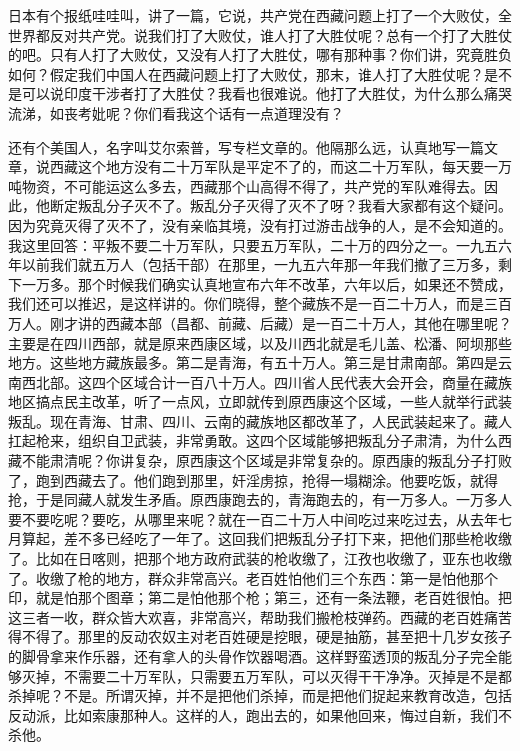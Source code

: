 日本有个报纸哇哇叫，讲了一篇，它说，共产党在西藏问题上打了一个大败仗，全世界都反对共产党。说我们打了大败仗，谁人打了大胜仗呢？总有一个打了大胜仗的吧。只有人打了大败仗，又没有人打了大胜仗，哪有那种事？你们讲，究竟胜负如何？假定我们中国人在西藏问题上打了大败仗，那末，谁人打了大胜仗呢？是不是可以说印度干涉者打了大胜仗？我看也很难说。他打了大胜仗，为什么那么痛哭流涕，如丧考妣呢？你们看我这个话有一点道理没有？

还有个美国人，名字叫艾尔索普，写专栏文章的。他隔那么远，认真地写一篇文章，说西藏这个地方没有二十万军队是平定不了的，而这二十万军队，每天要一万吨物资，不可能运这么多去，西藏那个山高得不得了，共产党的军队难得去。因此，他断定叛乱分子灭不了。叛乱分子灭得了灭不了呀？我看大家都有这个疑问。因为究竟灭得了灭不了，没有亲临其境，没有打过游击战争的人，是不会知道的。我这里回答：平叛不要二十万军队，只要五万军队，二十万的四分之一。一九五六年以前我们就五万人（包括干部）在那里，一九五六年那一年我们撤了三万多，剩下一万多。那个时候我们确实认真地宣布六年不改革，六年以后，如果还不赞成，我们还可以推迟，是这样讲的。你们晓得，整个藏族不是一百二十万人，而是三百万人。刚才讲的西藏本部（昌都、前藏、后藏）是一百二十万人，其他在哪里呢？主要是在四川西部，就是原来西康区域，以及川西北就是毛儿盖、松潘、阿坝那些地方。这些地方藏族最多。第二是青海，有五十万人。第三是甘肃南部。第四是云南西北部。这四个区域合计一百八十万人。四川省人民代表大会开会，商量在藏族地区搞点民主改革，听了一点风，立即就传到原西康这个区域，一些人就举行武装叛乱。现在青海、甘肃、四川、云南的藏族地区都改革了，人民武装起来了。藏人扛起枪来，组织自卫武装，非常勇敢。这四个区域能够把叛乱分子肃清，为什么西藏不能肃清呢？你讲复杂，原西康这个区域是非常复杂的。原西康的叛乱分子打败了，跑到西藏去了。他们跑到那里，奸淫虏掠，抢得一塌糊涂。他要吃饭，就得抢，于是同藏人就发生矛盾。原西康跑去的，青海跑去的，有一万多人。一万多人要不要吃呢？要吃，从哪里来呢？就在一百二十万人中间吃过来吃过去，从去年七月算起，差不多已经吃了一年了。这回我们把叛乱分子打下来，把他们那些枪收缴了。比如在日喀则，把那个地方政府武装的枪收缴了，江孜也收缴了，亚东也收缴了。收缴了枪的地方，群众非常高兴。老百姓怕他们三个东西：第一是怕他那个印，就是怕那个图章；第二是怕他那个枪；第三，还有一条法鞭，老百姓很怕。把这三者一收，群众皆大欢喜，非常高兴，帮助我们搬枪枝弹药。西藏的老百姓痛苦得不得了。那里的反动农奴主对老百姓硬是挖眼，硬是抽筋，甚至把十几岁女孩子的脚骨拿来作乐器，还有拿人的头骨作饮器喝酒。这样野蛮透顶的叛乱分子完全能够灭掉，不需要二十万军队，只需要五万军队，可以灭得干干净净。灭掉是不是都杀掉呢？不是。所谓灭掉，并不是把他们杀掉，而是把他们捉起来教育改造，包括反动派，比如索康那种人。这样的人，跑出去的，如果他回来，悔过自新，我们不杀他。

